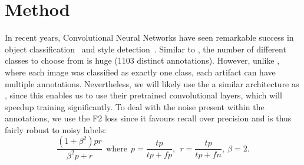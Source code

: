 \section{Method}
In recent years, Convolutional Neural Networks have seen remarkable success in object classification~\cite{alexnet} and style detection~\cite{style}.
Similar to \citet{alexnet}, the number of different classes to choose from is huge (1103 distinct annotations).
However, unlike \citeauthor{alexnet}, where each image was classified as exactly one class, each artifact can have multiple annotations.
Nevertheless, we will likely use the a similar architecture as \citeauthor{alexnet}, since this enables us to use their pretrained convolutional layers, which will speedup training significantly.
To deal with the noise present within the annotations, we use the F2 loss since it favours recall over precision and is thus fairly robust to noisy labels:
\begin{equation*}
    \frac{(1 + \beta^2) pr}{\beta^2 p+r}\ \ \mathrm{where}\ \ p = \frac{tp}{tp+fp},\ \ r = \frac{tp}{tp+fn},\ \beta = 2.
\end{equation*}

